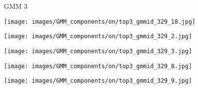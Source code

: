 \documentclass[10pt,twocolumn,letterpaper]{article}
\begin{document}
\begin{figure*}[t]
    
    \begin{minipage}[b]{0.005\textwidth}
    	\centering
    	\begin{turn}{90}
    GMM 3
    	\end{turn}
    	\vspace{2ex}
    \end{minipage}
    \hspace{0.01\textwidth}
    \begin{minipage}[b]{0.18\textwidth}
    	\centering
       	\texttt{[image: images/GMM\_components/on/top3\_gmmid\_329\_18.jpg]}
    \end{minipage}
    \hspace{0.005\textwidth}
    \begin{minipage}[b]{0.18\textwidth}
    	\centering
       	\texttt{[image: images/GMM\_components/on/top3\_gmmid\_329\_2.jpg]}
    \end{minipage}
    \hspace{0.005\textwidth}
    \begin{minipage}[b]{0.18\textwidth}
    	\centering
       	\texttt{[image: images/GMM\_components/on/top3\_gmmid\_329\_3.jpg]}
    \end{minipage}
    \hspace{0.005\textwidth}
	\begin{minipage}[b]{0.18\textwidth}
    	\centering
       	\texttt{[image: images/GMM\_components/on/top3\_gmmid\_329\_8.jpg]}
    \end{minipage}
    \hspace{0.005\textwidth}
    \begin{minipage}[b]{0.18\textwidth}
    	\centering
       	\texttt{[image: images/GMM\_components/on/top3\_gmmid\_329\_9.jpg]}
    \end{minipage}     



\end{figure*}
\end{document}
